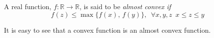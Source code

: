 \documentclass[12pt]{article}
\begin{document}
A real function, $f\colon \mathbb{R} \to \mathbb{R} $, is said to be \it{ almost convex} if
$$f(z)\leq \max\{f(x),\,f(y)\}, \,\,\, \forall x,y,z   \,\,\, x\leq z\leq y$$

It is easy to see that a convex function is an almost convex function.
\end{document}
